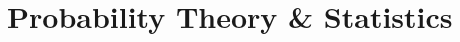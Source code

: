 \documentclass[12pt, a4paper]{report}
\begin{document}
% 
% 
% 
% 
% 
% 
% 
% 
% 
% 
% 
% 
% 
% 
% 
% 

\part{Probability Theory \& Statistics}


% 

% 

% 


% 
% 
% 
% 

% 
% 
% 
% 
% 
% 

% 
% 
% 
% 

% 
% 
% 
% 
% 
% 
% 
% 
\end{document}
